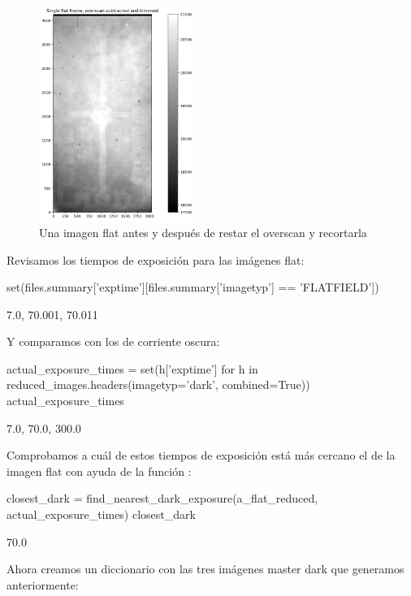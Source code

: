 \begin{figure}[htb]
  \centering
	\includegraphics[width=0.45\textwidth]{figures/flat_trimmed.png}
	\caption{Una imagen flat antes y después de restar el overscan y recortarla}
	\label{fig:flat_comparison} 
\end{figure}

Revisamos los tiempos de exposición para las imágenes flat:

\begin{pyin}
set(files.summary['exptime'][files.summary['imagetyp'] == 'FLATFIELD'])
\end{pyin}
\begin{pyprint}
{7.0, 70.001, 70.011}
\end{pyprint}

Y comparamos con los de corriente oscura:
\begin{pyin}
actual_exposure_times = set(h['exptime'] for h in reduced_images.headers(imagetyp='dark', combined=True))
actual_exposure_times
\end{pyin}
\begin{pyprint}
{7.0, 70.0, 300.0}
\end{pyprint}

Comprobamos a cuál de estos tiempos de exposición está más cercano el de la imagen flat con ayuda de la función :

\begin{pyin}
closest_dark = find_nearest_dark_exposure(a_flat_reduced, actual_exposure_times)
closest_dark
\end{pyin}
\begin{pyout}
70.0
\end{pyout}

Ahora creamos un diccionario con las tres imágenes master dark que generamos anteriormente:

